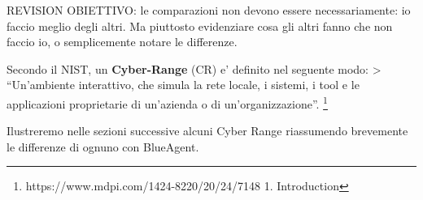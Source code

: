 REVISION OBIETTIVO: le comparazioni non devono essere necessariamente:
io faccio meglio degli altri. Ma piuttosto evidenziare cosa gli altri
fanno che non faccio io, o semplicemente notare le differenze.

Secondo il NIST, un \textbf{Cyber-Range} (CR) e' definito nel seguente
modo: \textgreater{} ``Un'ambiente interattivo, che simula la rete
locale, i sistemi, i tool e le applicazioni proprietarie di un'azienda o
di un'organizzazione''. \footnote{\label{fn:ref_1}https://www.mdpi.com/1424-8220/20/24/7148
  1. Introduction}

Ilustreremo nelle sezioni successive alcuni Cyber Range riassumendo
brevemente le differenze di ognuno con BlueAgent.
